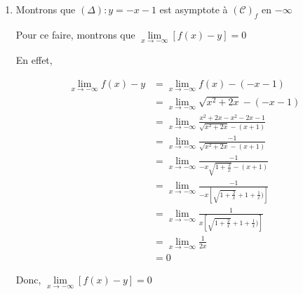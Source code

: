 \documentclass[12pt,a4paper]{article}
\begin{document}
\begin{enumerate}
\begin{enumerate}




\item Montrons que \( ( \Delta ) : y = -x - 1 \) est asymptote à \( ( \mathcal{C} )_{f}\) en \( -\infty \)

Pour ce faire, montrons que \( \lim\limits_{x \to -\infty} \left[ f(x) - y \right] = 0\)

En effet,

\begin{align*}
    \lim_{x \to -\infty} f(x) - y &= \lim_{x \to -\infty} f(x) - (-x - 1)\\
                                  &= \lim_{x \to -\infty} \sqrt{x^{2}+2x} - (-x-1)\\
                                  &= \lim_{x \to -\infty} \frac{x^2 + 2x - x^2 - 2x - 1}{\sqrt{x^2 + 2x} - (x + 1)}\\
                                  &= \lim_{x \to -\infty} \frac{-1}{\sqrt{x^2 + 2x} - (x + 1)}\\
                                  &= \lim_{x \to -\infty} \frac{-1}{-x \sqrt{1 + \frac{2}{x}} - (x + 1)}\\
                                  &= \lim_{x \to -\infty} \frac{-1}{-x \left[\sqrt{1 + \frac{2}{x}} + 1 + \frac{1}{x})\right]}\\
                                  &= \lim_{x \to -\infty} \frac{1}{x \left[\sqrt{1 + \frac{2}{x}} + 1 + \frac{1}{x})\right]}\\
                                  &= \lim_{x \to -\infty} \frac{1}{2x}\\
                                  &=0
\end{align*}

Donc, \( \lim\limits_{x \to -\infty} \left[ f(x) - y \right] = 0 \)


\end{enumerate}
\end{enumerate}
\end{document}

